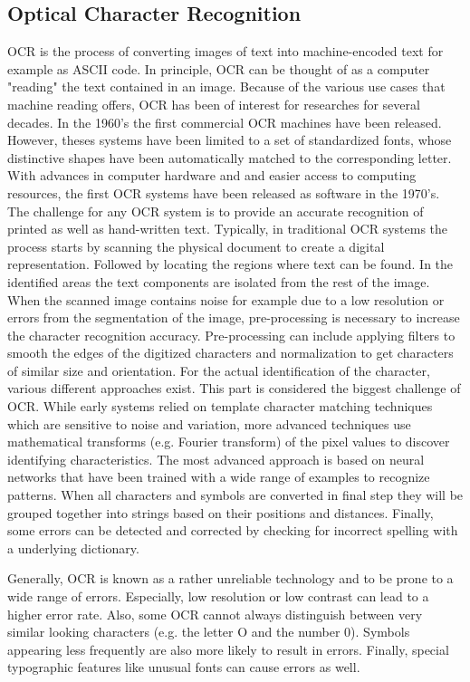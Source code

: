 \subsection{Optical Character Recognition}
\ac{OCR} is the process of converting images of text into machine-encoded text for example as ASCII code. In principle, \ac{OCR} can be thought of as a computer "reading" the text contained in an image. \cite{eikvil1993optical}
Because of the various use cases that machine reading offers, \ac{OCR} has been of interest for researches for several decades. In the 1960's the first commercial \ac{OCR} machines have been released. However, theses systems have been limited to a set of standardized fonts, whose distinctive shapes have been automatically matched to the corresponding letter. 
With advances in computer hardware and and easier access to computing resources, the first \ac{OCR} systems have been released as software in the 1970's. 
The challenge for any \ac{OCR} system is to provide an accurate recognition of printed as well as hand-written text.
Typically, in traditional \ac{OCR} systems the process starts by scanning the physical document to create a digital representation. Followed by locating the regions where text can be found. In the identified areas the text components are isolated from the rest of the image. When the scanned image contains noise for example due to a low resolution or errors from the segmentation of the image, pre-processing is necessary to increase the character recognition accuracy. Pre-processing can include applying filters to smooth the edges of the digitized characters and normalization to get characters of similar size and orientation. For the actual identification of the character, various different approaches exist. This part is considered the biggest challenge of \ac{OCR}. While early systems relied on template character matching techniques which are sensitive to noise and variation, more advanced techniques use mathematical transforms (e.g. Fourier transform) of the pixel values to discover identifying characteristics. The most advanced approach is based on neural networks that have been trained with a wide range of examples to recognize patterns. When all characters and symbols are converted in final step they will be grouped together into strings based on their positions and distances. Finally, some errors can be detected and corrected by checking for incorrect spelling with a underlying dictionary.
\cite{eikvil1993optical,nagy1999optical}

Generally, \ac{OCR} is known as a rather unreliable technology and to be prone to a wide range of errors. Especially, low resolution or low contrast can lead to a higher error rate. Also, some \ac{OCR} cannot always distinguish between very similar looking characters (e.g. the letter O and the number 0). Symbols appearing less frequently are also more likely to result in errors. Finally, special typographic features like unusual fonts can cause errors as well.
\cite{nagy1999optical,baird2004robust}

